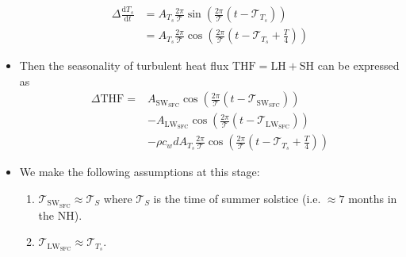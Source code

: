 \documentclass{ametsocV5}
\begin{document}
\begin{itemize}
                \begin{align}
                  \Delta \frac{\mathrm{d}T_{s}}{\mathrm{d}t} &= A_{T_{s}}\frac{2\pi}{\mathcal{T}}\sin\left(\frac{2\pi}{\mathcal{T}}(t-\mathscr{T}_{T_{s}})\right) \\
                                                             &= A_{T_{s}}\frac{2\pi}{\mathcal{T}}\cos\left(\frac{2\pi}{\mathcal{T}}\left(t-\mathscr{T}_{T_{s}}+\frac{T}{4}\right)\right)
                \end{align}
          \item Then the seasonality of turbulent heat flux $\mathrm{THF=LH+SH}$ can be expressed as
                \begin{equation}
                  \begin{aligned}
                    \Delta \mathrm{THF} =& A_{\mathrm{SW_{SFC}}}\cos\left(\frac{2\pi}{\mathcal{T}}(t-\mathscr{T}_{\mathrm{SW_{SFC}}})\right) \\
                    &- A_{\mathrm{LW_{SFC}}}\cos\left(\frac{2\pi}{\mathcal{T}}(t-\mathscr{T}_{\mathrm{LW_{SFC}}})\right) \\
                    &- \rho c_{w} d A_{T_{s}}\frac{2\pi}{\mathcal{T}}\cos\left(\frac{2\pi}{\mathcal{T}}\left(t-\mathscr{T}_{T_{s}}+\frac{T}{4}\right)\right)
                  \end{aligned}
                \end{equation}
          \item We make the following assumptions at this stage:
                \begin{enumerate}
                  \item $\mathscr{T}_{\mathrm{SW_{SFC}}} \approx \mathscr{T}_{S}$ where $\mathscr{T}_{S}$ is the time of summer solstice (i.e. $\approx 7$ months in the NH).
                  \item $\mathscr{T}_{\mathrm{LW_{SFC}}} \approx \mathscr{T}_{T_{s}}$.
                \end{enumerate}


\end{itemize}
\end{document}
